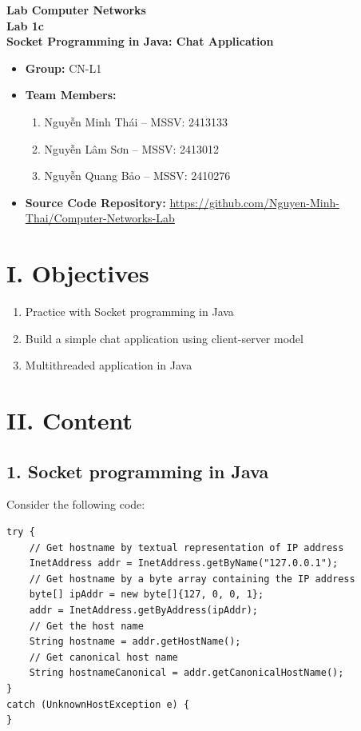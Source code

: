 \documentclass[11pt,a4paper]{article}
\begin{document}
\begin{center}
    {\large \textbf{Lab Computer Networks }}\\[2pt]
    {\large \textbf{Lab 1c}}\\[4pt]
    {\Large \textbf{Socket Programming in Java: Chat Application}}\\[12pt]
\end{center}

\hline
\begin{itemize}
    \item \textbf{Group:} CN-L1
    \item \textbf{Team Members:}
    \begin{enumerate}
        \item Nguyễn Minh Thái -- MSSV: 2413133
        \item Nguyễn Lâm Sơn -- MSSV: 2413012
        \item Nguyễn Quang Bảo -- MSSV: 2410276
    \end{enumerate}
    \item \textbf{Source Code Repository:} \url{https://github.com/Nguyen-Minh-Thai/Computer-Networks-Lab}
\end{itemize}
\hline

\vspace{0.4cm}

\section*{I. Objectives}
\begin{enumerate}
    \item Practice with Socket programming in Java
    \item Build a simple chat application using client-server model
    \item Multithreaded application in Java
\end{enumerate}

\section*{II. Content}

\subsection*{1. Socket programming in Java}
\noindent Consider the following code:
\begin{lstlisting}
try {
    // Get hostname by textual representation of IP address
    InetAddress addr = InetAddress.getByName("127.0.0.1");
    // Get hostname by a byte array containing the IP address
    byte[] ipAddr = new byte[]{127, 0, 0, 1};
    addr = InetAddress.getByAddress(ipAddr);
    // Get the host name
    String hostname = addr.getHostName();
    // Get canonical host name
    String hostnameCanonical = addr.getCanonicalHostName();
}
catch (UnknownHostException e) {
}
\end{lstlisting}
\end{document}
